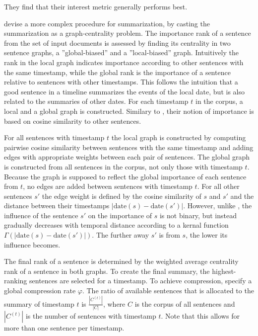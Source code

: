 \documentclass[a4paper,BCOR=10mm]{report}
\begin{document}
They find that their interest metric generally performs best.

\citet{yan-trans} devise a more complex procedure for summarization, by casting the summarization as a graph-centrality problem.
The importance rank of a sentence from the set of input documents is assessed by finding its centrality in two sentence graphs, a ''global-biased'' and a ''local-biased'' graph.
Intuitively the rank in the local graph indicates importance according to other sentences with the same timestamp, while the global rank is the importance of a sentence relative to sentences with other timestamps. This follows the intuition that a good sentence in a timeline summarizes the events of the local date, but is also related to the summaries of other dates. For each timestamp $t$ in the corpus, a local and a global graph is constructed.
Similary to \citet{chieu}, their notion of importance is based on cosine similarity to other sentences.

For all sentences with timestamp $t$ the local graph is constructed by computing pairwise cosine similarity between sentences with the same timestamp and adding edges with appropriate weights between each pair of sentences.
The global graph is constructed from all sentences in the corpus, not only those with timestamp $t$. Because the graph is supposed to reflect the global importance of each sentence from $t$, no edges are added between sentences with timestamp $t$.
For all other sentences $s'$ the edge weight is defined by the cosine similarity of $s$ and $s'$ and the distance between their timestamps $|\text{date}(s) - \text{date}(s')|$. However, unlike \citet{chieu}, the influence of the sentence $s'$ on the importance of $s$ is not binary, but instead gradually decreases with temporal distance according to a kernal function $\Gamma(|\text{date}(s) - \text{date}(s')|)$. The further away $s'$ is from $s$, the lower its influence becomes.

The final rank of a sentence is determined by the weighted average centrality rank of a sentence in both graphs.
To create the final summary, the highest-ranking sentences are selected for a timestamp. To achieve compression, \citeauthor{yan-trans} specify a global compression rate $\varphi$. The ratio of available sentences that is allocated to the summary of timestamp $t$ is $\frac{|C^{(t)}|}{|C|}$, where $C$ is the corpus of all sentences and $|C^{(t)}|$ is the number of sentences with timestamp $t$. Note that this allows for more than one sentence per timestamp.
\end{document}
